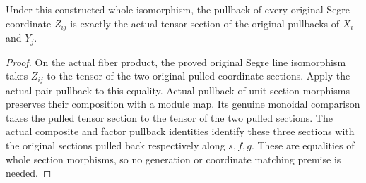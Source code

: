 \begin{theorem}
\label{thm:original-segre-pulled-coordinate-section}
\leanok
{}
Under this constructed whole isomorphism, the pullback of every original
Segre coordinate $Z_{ij}$ is exactly the actual tensor section of the
original pullbacks of $X_i$ and $Y_j$.
\end{theorem}
\begin{proof}
On the actual fiber product, the proved original Segre line isomorphism
takes $Z_{ij}$ to the tensor of the two original pulled coordinate
sections. Apply the actual pair pullback to this equality. Actual
pullback of unit-section morphisms preserves their composition with a
module map. Its genuine monoidal comparison takes the pulled tensor
section to the tensor of the two pulled sections. The actual composite
and factor pullback identities identify these three sections with the
original sections pulled back respectively along $s,f,g$. These are
equalities of whole section morphisms, so no generation or coordinate
matching premise is needed.
\end{proof}

